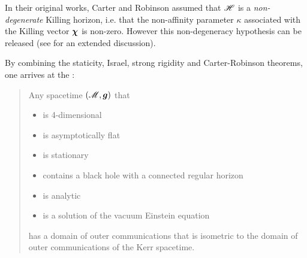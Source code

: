 \begin{remark}
In their original works, Carter and Robinson assumed that $\mathscr{H}$ is a
\emph{non-degenerate}
Killing horizon, i.e. that the non-affinity parameter $\kappa$ associated
with the Killing vector $\bm{\chi}$ is non-zero. However this non-degeneracy
hypothesis can be released \cite{ChrusN10} (see \cite{ChrusLH12} for an
extended discussion).
\end{remark}

By combining the staticity, Israel, strong rigidity and Carter-Robinson theorems,
one arrives at the :
\begin{quote}
Any spacetime $(\mathscr{M},\bm{g})$ that
\begin{itemize}
\item is 4-dimensional
\item is asymptotically flat
\item is stationary
\item contains a black hole with a connected regular horizon
\item is analytic
\item is a solution of the vacuum Einstein equation
\end{itemize}
has a domain of outer communications that is isometric
to the domain of outer communications of the Kerr spacetime.
\end{quote}

